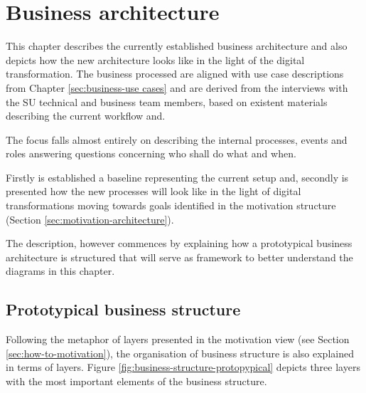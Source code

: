 
	
\chapter{Business architecture}
\label{sec:business-architecture}
	
	This chapter describes the currently established business architecture and also depicts how the new architecture looks like in the light of the digital transformation. The business processed are aligned with use case descriptions from Chapter \ref{sec:business-use cases} and are derived from the interviews with the SU technical and business team members, based on existent materials describing the current workflow and.
	
 	The focus falls almost entirely on describing the internal processes, events and roles answering questions concerning who shall do what and when.
		
	Firstly is established a baseline representing the current setup and, secondly is presented how the new processes will look like in the light of digital transformations moving towards goals identified in the motivation structure (Section \ref{sec:motivation-architecture}).
	
	The description, however commences by explaining how a prototypical business architecture is structured that will serve as framework to better understand the diagrams in this chapter. 	
	
	\section{Prototypical business structure}
	
	Following the metaphor of layers presented in the motivation view (see Section \ref{sec:how-to-motivation}), the organisation of business structure is also explained in terms of layers. Figure \ref{fig:business-structure-protopypical} depicts three layers with the most important elements of the business structure. 
	
	
